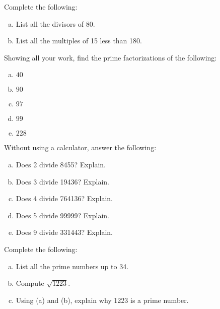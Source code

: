 \documentclass[11pt,letterpaper]{article}
\begin{document}

 Complete the following:
	\begin{enumerate}[(a)]
	\item List all the divisors of 80.
	\item List all the multiples of 15 less than 180. 
	\end{enumerate}



\newpage



 Showing all your work, find the prime factorizations of the following:
	\begin{enumerate}[(a)]
	\item $40$
	\item $90$
	\item $97$
	\item $99$
	\item $228$
	\end{enumerate}



\newpage



 Without using a calculator, answer the following:
	\begin{enumerate}[(a)]
	\item Does 2 divide 8455? Explain.
	\item Does 3 divide 19436? Explain.
	\item Does 4 divide 764136? Explain.
	\item Does 5 divide 99999? Explain.
	\item Does 9 divide 331443? Explain. 
	\end{enumerate}



\newpage



 Complete the following:
	\begin{enumerate}[(a)]
	\item List all the prime numbers up to 34.
	\item Compute $\sqrt{1223}$.
	\item Using (a) and (b), explain why 1223 is a prime number. 
	\end{enumerate}
\end{document}
